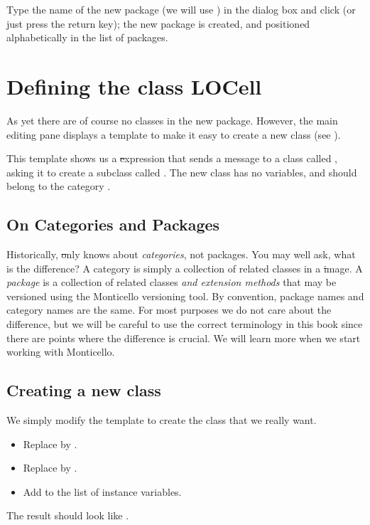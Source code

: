 \documentclass[a4paper,10pt,twoside]{book}
\begin{document}
Type the name of the new package (we will use ) in the dialog box and click  (or just press the return key); the new package is created, and positioned alphabetically in the list of packages.

\section{Defining the class LOCell}

As yet there are  of course no classes in the new package. However, the main editing pane displays a template to make it easy to create a new class (see ).

This template shows us a \st expression that sends a message to a class called , asking it to create a subclass called .  The new class has no variables, and should belong to the category .

\subsection{On Categories and Packages}
\label{sec:categoriesPackages}

Historically, \st only knows about \emph{categories}, not packages.
You may well ask, what is the difference?
A category is simply a collection of related classes in a \st image.
A \emph{package} is a collection of related classes \emph{and extension methods} that may be versioned using the Monticello versioning tool.
By convention, package names and category names are the same.
For most purposes we do not care about the difference, but we will be careful to use the correct terminology in this book since there are points where the difference is crucial.
We will learn more when we start working with Monticello.

\subsection{Creating a new class}

We simply modify the template to create the class that we really want.

\begin{itemize}
  \item Replace  by .
  \item Replace  by .
  \item Add  to the list of instance variables.
\end{itemize}
The result should look like .
\end{document}
